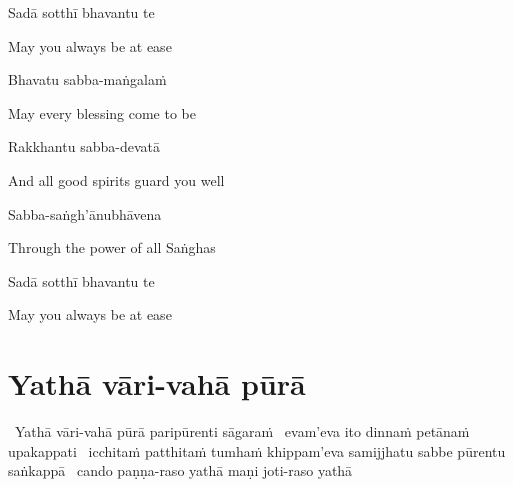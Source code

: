 Sadā sotthī bhavantu te

\begin{english}
  May you always be at ease
\end{english}

Bhavatu sabba-maṅgalaṁ

\begin{english}
  May every blessing come to be
\end{english}

Rakkhantu sabba-devatā

\begin{english}
  And all good spirits guard you well
\end{english}

Sabba-saṅgh'ānubhāvena

\begin{english}
  Through the power of all Saṅghas
\end{english}

Sadā sotthī bhavantu te

\begin{english}
  May you always be at ease
\end{english}



\clearpage

\setsecheadstyle{\subsectionFmt}
\section{Yathā vāri-vahā pūrā}
\label{yatha-vari-vaha-pura}

\vspace{-0.99em}

  \anglebracketleft\ \hspace{-0.5mm}Yathā vāri-vahā pūrā paripūrenti sāgaraṁ \breathmark\ evam'eva ito dinnaṁ petānaṁ upakappati \breathmark\ icchitaṁ patthitaṁ tumhaṁ khippam'eva samijjhatu sabbe pūrentu saṅkappā \breathmark\ cando paṇṇa-raso yathā maṇi joti-raso yathā\makeatletter\hyperlink{endnote119-appendix}\makeatother \thinspace\hspace{-0.5mm}\anglebracketright\

